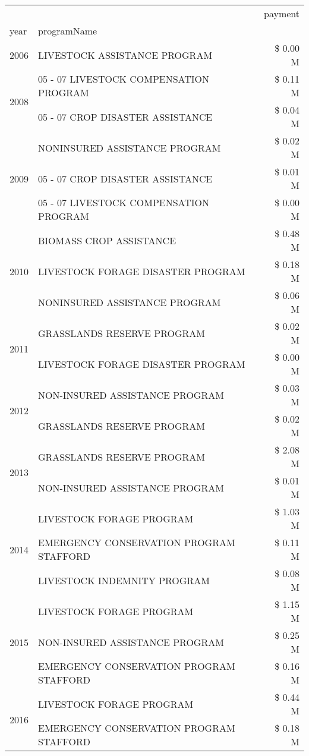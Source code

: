 \begin{tabular}{llr}
\toprule
 &  & payment \\
year & programName &  \\
\midrule
2006 & LIVESTOCK ASSISTANCE PROGRAM & \$ 0.00 M \\
\cline{1-3}
\multirow[t]{2}{*}{2008} & 05 - 07 LIVESTOCK COMPENSATION PROGRAM & \$ 0.11 M \\
 & 05 - 07 CROP DISASTER ASSISTANCE & \$ 0.04 M \\
\cline{1-3}
\multirow[t]{3}{*}{2009} & NONINSURED ASSISTANCE PROGRAM & \$ 0.02 M \\
 & 05 - 07 CROP DISASTER ASSISTANCE & \$ 0.01 M \\
 & 05 - 07 LIVESTOCK COMPENSATION PROGRAM & \$ 0.00 M \\
\cline{1-3}
\multirow[t]{3}{*}{2010} & BIOMASS CROP ASSISTANCE & \$ 0.48 M \\
 & LIVESTOCK FORAGE DISASTER  PROGRAM & \$ 0.18 M \\
 & NONINSURED ASSISTANCE PROGRAM & \$ 0.06 M \\
\cline{1-3}
\multirow[t]{2}{*}{2011} & GRASSLANDS RESERVE PROGRAM & \$ 0.02 M \\
 & LIVESTOCK FORAGE DISASTER PROGRAM & \$ 0.00 M \\
\cline{1-3}
\multirow[t]{2}{*}{2012} & NON-INSURED ASSISTANCE PROGRAM & \$ 0.03 M \\
 & GRASSLANDS RESERVE PROGRAM & \$ 0.02 M \\
\cline{1-3}
\multirow[t]{2}{*}{2013} & GRASSLANDS RESERVE PROGRAM & \$ 2.08 M \\
 & NON-INSURED ASSISTANCE PROGRAM & \$ 0.01 M \\
\cline{1-3}
\multirow[t]{3}{*}{2014} & LIVESTOCK FORAGE PROGRAM & \$ 1.03 M \\
 & EMERGENCY CONSERVATION PROGRAM STAFFORD & \$ 0.11 M \\
 & LIVESTOCK INDEMNITY PROGRAM & \$ 0.08 M \\
\cline{1-3}
\multirow[t]{3}{*}{2015} & LIVESTOCK FORAGE PROGRAM & \$ 1.15 M \\
 & NON-INSURED ASSISTANCE PROGRAM & \$ 0.25 M \\
 & EMERGENCY CONSERVATION PROGRAM STAFFORD & \$ 0.16 M \\
\cline{1-3}
\multirow[t]{3}{*}{2016} & LIVESTOCK FORAGE PROGRAM                      & \$ 0.44 M \\
 & EMERGENCY CONSERVATION PROGRAM STAFFORD       & \$ 0.18 M \\

\end{tabular}
